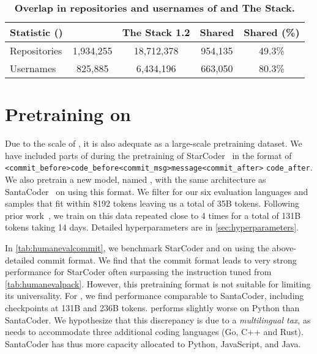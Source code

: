 \begin{table*}[htbp]
    \centering
    \begin{tabular}{l|cc|cc}
    \toprule
    Statistic () & \data{} & The Stack 1.2 & Shared & Shared (\%) \\
    \midrule
    Repositories & 1,934,255 & 18,712,378 & 954,135 & 49.3\% \\
    Usernames & 825,885 & 6,434,196 & 663,050 & 80.3\% \\
    \bottomrule
    \end{tabular}
    \caption{
        \textbf{Overlap in repositories and usernames of \data{} and The Stack.}
    }
    \label{tab:overlap}
\end{table*}

\FloatBarrier


\section{Pretraining on \data{}}
\label{sec:pretraining}

Due to the scale of \data{}, it is also adequate as a large-scale pretraining dataset. We have included parts of \data{} during the pretraining of StarCoder~\citep{li2023starcoder} in the format of \verb|<commit_before>code_before<commit_msg>message<commit_after>| \verb|code_after|.
We also pretrain a new model, named \modelsc{}, with the same architecture as SantaCoder~\citep{allal2023santacoder} on \data{} using this format. We filter \data{} for our six evaluation languages and samples that fit within 8192 tokens leaving us a total of 35B tokens. Following prior work~\citep{muennighoff2023scaling}, we train on this data repeated close to 4 times for a total of 131B tokens taking 14 days. Detailed hyperparameters are in \autoref{sec:hyperparameters}.

In \autoref{tab:humanevalcommit}, we benchmark StarCoder and \modelsc{} on \evalf{} using the above-detailed commit format. We find that the commit format leads to very strong performance for StarCoder often surpassing the instruction tuned \model{} from \autoref{tab:humanevalpack}. However, this pretraining format is not suitable for \evale{} limiting its universality.
For \modelsc{}, we find performance comparable to SantaCoder, including checkpoints at 131B and 236B tokens. \modelsc{} performs slightly worse on Python than SantaCoder. We hypothesize that this discrepancy is due to a \textit{multilingual tax}, as \modelsc{} needs to accommodate three additional coding languages (Go, C++ and Rust). SantaCoder has thus more capacity allocated to Python, JavaScript, and Java.

